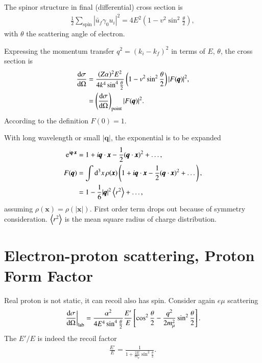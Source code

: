 The spinor structure in final (differential) cross section  is
\begin{align*}
   \frac{1}{2} \sum_{\text{spin}} \left| \bar{u}_f \gamma_0 u_i \right|^2 = 4 E^2 \left(1- v^2 \sin^2\frac{\theta}{2} \right),
\end{align*}
with $\theta$ the scattering angle of electron.

Expressing the momentum transfer $q^2 = (k_i - k_f)^2 $ in terms of $E$, $\theta$, the cross section is
\begin{align}
   \dv{\sigma}{\Omega} &= \frac{(Z\alpha)^2 E^2}{4 k^4 \sin^4 \frac{\theta}{2}} \left(1- v^2 \sin^2 \frac{\theta}{2} \right) |F(\pmb{q})|^2, \\
                       &= \left( \dv{\sigma}{\Omega} \right)_{\text{point}} |F(\pmb{q})|^2.
\end{align}
According to the definition $F(0) = 1$.

With long wavelength or small $|\pmb{q}|$, the exponential is to be expanded
\begin{align*}
   \mathrm{e}^{i \pmb{q} \cdot\pmb {x}} &= 1 + i \pmb{q} \cdot \pmb{x} - \frac{1}{2} (\pmb{q} \cdot \pmb{x})^2 + \dots, \\
   F(\pmb{q}) &= \int \dd[3]{x} \rho(\pmb{x}) \left( 1 + i \pmb{q}\cdot \pmb{x} - \frac{1}{2} (\pmb{q} \cdot \pmb{x})^2 + \dots \right), \\
              &= 1 - \frac{1}{6} |\pmb{q}|^2 \expval{r^2} + \dots,
\end{align*}
assuming $\rho(\pmb{x}) = \rho(|\pmb{x}|)$. First order term drops out because of symmetry consideration. $\expval{r^2}$ is the mean square radius of charge distribution.

\section{Electron-proton scattering, Proton Form Factor}
Real proton is not static, it can recoil also has spin. Consider again $e\mu$ scattering
\begin{align}
   \eval{\dv{\sigma}{\Omega}}_{\text{lab}} = \frac{\alpha^2}{4 E^4 \sin^4 \frac{\theta}{2}} \frac{E'}{E} \left[ \cos^2 \frac{\theta}{2} - \frac{q^2}{2m_\mu^2} \sin^2 \frac{\theta}{2} \right].
\end{align}
The $E'/E$ is indeed the recoil factor
\begin{align*}
   \frac{E'}{E} = \frac{1}{1 + \frac{2E}{m_\mu } \sin^2 \frac{\theta}{2}}.
\end{align*}

